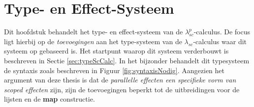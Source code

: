 \chapter{Type- en Effect-Systeem}
\label{hoofdstuk:typesysteem}
Dit hoofdstuk behandelt het type- en effect-systeem van de $\lambda^{p}_{sc}$-calculus. De focus ligt hierbij op de \emph{
toevoegingen} aan het type-systeem van de $\lambda_{sc}$-calculus waar dit systeem op gebaseerd is. Het startpunt waarop dit systeem verderbouwt is beschreven in Sectie \ref{sec:typeScCalc}. In het bijzonder behandelt dit typesysteem de syntaxis zoals beschreven in Figuur \ref{fig:syntaxisNodig}. Aangezien het argument van deze thesis is dat de \emph{parallelle effecten een specifieke vorm van scoped effecten} zijn, zijn de toevoegingen beperkt tot de uitbreidingen voor de lijsten en de \textbf{map} constructie.


